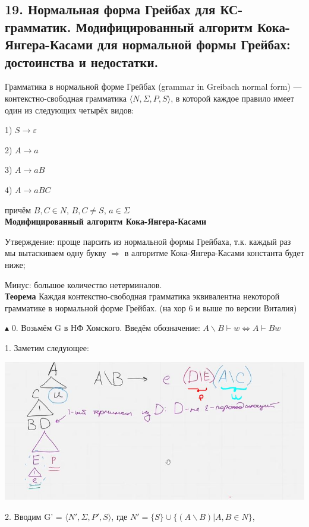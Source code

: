 \subsection{19. Нормальная форма Грейбах для КС-грамматик. Модифицированный алгоритм Кока-Янгера-Касами для нормальной формы Грейбах: достоинства и недостатки.}

\Def Грамматика в нормальной форме Грейбах (grammar in Greibach normal form) — контекстно-свободная грамматика $\langle N, \Sigma, P, S \rangle$, в которой каждое правило имеет один из следующих четырёх видов:

1) $S \rightarrow \varepsilon$

2) $A \rightarrow a$

3) $A \rightarrow aB$

4) $A \rightarrow aBC$

причём $B, C \in N$, $B, C \neq S$, $a \in \Sigma$\\

\textbf{Модифицированный алгоритм Кока-Янгера-Касами}

Утверждение: проще парсить из нормальной формы Грейбаха, т.к. каждый раз мы вытаскиваем одну букву $\Rightarrow$ в алгоритме Кока-Янгера-Касами константа будет ниже; 

Минус: большое количество нетерминалов.\\


\textbf{Теорема} Каждая контекстно-свободная грамматика
эквивалентна некоторой грамматике в нормальной форме
Грейбах. (на хор 6 и выше по версии Виталия)

$\blacktriangle$
0. Возьмём G в НФ Хомского. Введём обозначение: $A \backslash B \vdash w \Leftrightarrow A \vdash Bw$

1. Заметим следующее:

\includegraphics[width=15cm]{images/greybach.JPG}

2. Вводим G' =  $\langle N', \Sigma, P', S \rangle$, где $N' = \{S\} \cup \{(A \backslash B) | A, B \in N\}$, 


